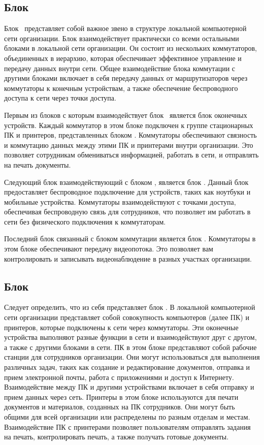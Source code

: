\subsection{Блок \blockSwith}   

Блок \blockSwith\ представляет собой важное звено в структуре локальной компьютерной сети организации. 
Блок взаимодействует практически со всеми остальными блоками в локальной сети организации. 
Он состоит из нескольких коммутаторов, объединенных в иерархию, которая обеспечивает эффективное управление и передачу данных внутри сети. 
Общее взаимодействие блока коммутации с другими блоками включает в себя передачу данных от маршрутизаторов через коммутаторы к конечным 
устройствам, а также обеспечение беспроводного доступа к сети через точки доступа. 

Первым из блоков с которым взаимодействует блок \blockSwith\ является блок оконечных устройств. 
Каждый коммутатор в этом блоке подключен к группе стационарных ПК и принтеров, представленных блоком \blockDevices\@. 
Коммутаторы обеспечивают связность и коммутацию данных между этими ПК и принтерами внутри организации. 
Это позволяет сотрудникам обмениваться информацией, работать в сети, и отправлять на печать документы.

Следующий блок взаимодействующий с блоком \blockSwith\@, является блок \blockAccessPoint\@. 
Данный блок предоставляет беспроводное подключение для устройств, таких как ноутбуки и мобильные устройства. 
Коммутаторы взаимодействуют с точками доступа, обеспечивая беспроводную связь для сотрудников,
что позволяет им работать в сети без физического подключения к коммутаторам.

Последний блок связанный с блоком коммутации является блок \blockVideo\@. 
Коммутаторы в этом блоке обеспечивают передачу видеопотока. 
Это позволяет вам контролировать и записывать видеонаблюдение в разных участках организации.

\subsection{Блок \blockDevices}   

Следует определить, что из себя представляет блок \blockDevices\@. 
В локальной компьютерной сети организации представляет собой совокупность компьютеров (далее ПК) и принтеров, 
которые подключены к сети через коммутаторы. 
Эти оконечные устройства выполняют разные функции в сети и взаимодействуют друг с другом, а также с другими блоками в сети. 
ПК в этом блоке представляют собой рабочие станции для сотрудников организации. Они могут использоваться для выполнения различных задач, 
таких как создание и редактирование документов, отправка и прием электронной почты, работа с приложениями и доступ к Интернету.
Взаимодействие между ПК и другими устройствами включает в себя отправку и прием данных через сеть.
Принтеры в этом блоке используются для печати документов и материалов, созданных на ПК сотрудников. 
Они могут быть общими для всей организации или распределены по разным отделам и местам.
Взаимодействие ПК с принтерами позволяет пользователям отправлять задания на печать, контролировать печать, а также получать готовые документы.

